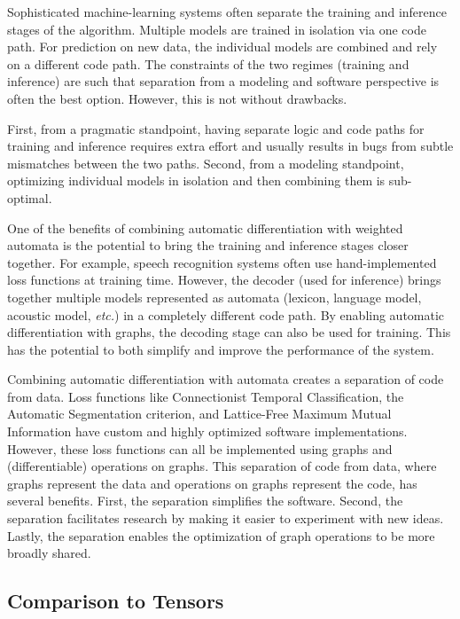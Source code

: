 Sophisticated machine-learning systems often separate the training and
inference stages of the algorithm. Multiple models are trained in isolation via
one code path. For prediction on new data, the individual models are combined
and rely on a different code path. The constraints of the two regimes (training
and inference) are such that separation from a modeling and software
perspective is often the best option. However, this is not without drawbacks.

First, from a pragmatic standpoint, having separate logic and code paths for
training and inference requires extra effort and usually results in bugs from
subtle mismatches between the two paths. Second, from a modeling standpoint,
optimizing individual models in isolation and then combining them is
sub-optimal.

One of the benefits of combining automatic differentiation with weighted
automata is the potential to bring the training and inference stages closer
together. For example, speech recognition systems often use hand-implemented
loss functions at training time. However, the decoder (used for inference)
brings together multiple models represented as automata (lexicon, language model,
acoustic model, \emph{etc.}) in a completely different code path. By enabling
automatic differentiation with graphs, the decoding stage can also be used for
training. This has the potential to both simplify and improve the performance
of the system.

Combining automatic differentiation with automata creates a separation of code
from data. Loss functions like Connectionist Temporal Classification, the
Automatic Segmentation criterion, and Lattice-Free Maximum Mutual Information
have custom and highly optimized software implementations. However, these loss
functions can all be implemented using graphs and (differentiable) operations
on graphs. This separation of code from data, where graphs represent the data
and operations on graphs represent the code, has several benefits. First, the
separation simplifies the software. Second, the separation facilitates research
by making it easier to experiment with new ideas. Lastly, the separation
enables the optimization of graph operations to be more broadly shared.

\subsection{Comparison to Tensors}
\label{sec:comparison_to_tensors}

